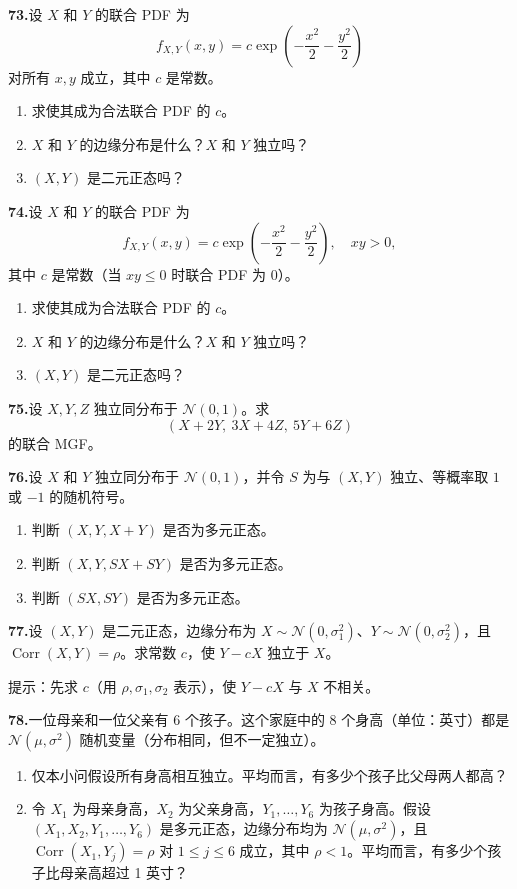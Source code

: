 \documentclass[UTF8, 12pt, fontset=fandol, oneside]{ctexart}
\begin{document}
\noindent\textbf{73.}\quad 设 $X$ 和 $Y$ 的联合 PDF 为
\[
  f_{X,Y}(x,y)=c\exp\left(-\frac{x^2}{2}-\frac{y^2}{2}\right)
\]
对所有 $x,y$ 成立，其中 $c$ 是常数。
\begin{enumerate}
  \item[(a)] 求使其成为合法联合 PDF 的 $c$。
  \item[(b)] $X$ 和 $Y$ 的边缘分布是什么？$X$ 和 $Y$ 独立吗？
  \item[(c)] $(X,Y)$ 是二元正态吗？
\end{enumerate}

\noindent\textbf{74.}\quad 设 $X$ 和 $Y$ 的联合 PDF 为
\[
  f_{X,Y}(x,y)=c\exp\left(-\frac{x^2}{2}-\frac{y^2}{2}\right),\quad xy>0,
\]
其中 $c$ 是常数（当 $xy\le 0$ 时联合 PDF 为 $0$）。
\begin{enumerate}
  \item[(a)] 求使其成为合法联合 PDF 的 $c$。
  \item[(b)] $X$ 和 $Y$ 的边缘分布是什么？$X$ 和 $Y$ 独立吗？
  \item[(c)] $(X,Y)$ 是二元正态吗？
\end{enumerate}

\noindent\textbf{75.}\quad 设 $X,Y,Z$ 独立同分布于 $\mathcal{N}(0,1)$。求
\[
  (X+2Y,\ 3X+4Z,\ 5Y+6Z)
\]
的联合 MGF。

\noindent\textbf{76.}\quad 设 $X$ 和 $Y$ 独立同分布于 $\mathcal{N}(0,1)$，并令 $S$ 为与 $(X,Y)$ 独立、等概率取 $1$ 或 $-1$ 的随机符号。
\begin{enumerate}
  \item[(a)] 判断 $(X,Y,X+Y)$ 是否为多元正态。
  \item[(b)] 判断 $(X,Y,SX+SY)$ 是否为多元正态。
  \item[(c)] 判断 $(SX,SY)$ 是否为多元正态。
\end{enumerate}

\noindent\textbf{77.}\quad 设 $(X,Y)$ 是二元正态，边缘分布为 $X\sim \mathcal{N}(0,\sigma_1^2)$、$Y\sim \mathcal{N}(0,\sigma_2^2)$，且 $\operatorname{Corr}(X,Y)=\rho$。求常数 $c$，使 $Y-cX$ 独立于 $X$。

提示：先求 $c$（用 $\rho,\sigma_1,\sigma_2$ 表示），使 $Y-cX$ 与 $X$ 不相关。

\noindent\textbf{78.}\quad 一位母亲和一位父亲有 6 个孩子。这个家庭中的 8 个身高（单位：英寸）都是 $\mathcal{N}(\mu,\sigma^2)$ 随机变量（分布相同，但不一定独立）。
\begin{enumerate}
  \item[(a)] 仅本小问假设所有身高相互独立。平均而言，有多少个孩子比父母两人都高？
  \item[(b)] 令 $X_1$ 为母亲身高，$X_2$ 为父亲身高，$Y_1,\ldots,Y_6$ 为孩子身高。假设 $(X_1,X_2,Y_1,\ldots,Y_6)$ 是多元正态，边缘分布均为 $\mathcal{N}(\mu,\sigma^2)$，且 $\operatorname{Corr}(X_1,Y_j)=\rho$ 对 $1\le j\le 6$ 成立，其中 $\rho<1$。平均而言，有多少个孩子比母亲高超过 1 英寸？
\end{enumerate}
\end{document}
